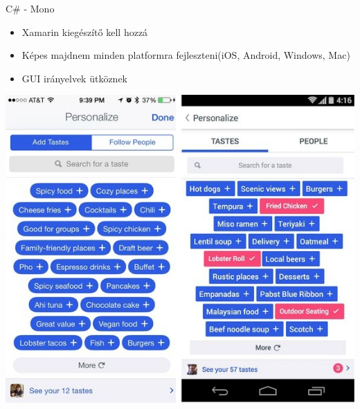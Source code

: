 \documentclass{beamer}
\begin{document}
\begin{frame}[fragile]{C\# - Mono}
	\begin{minipage}{0.49\textwidth}
		\begin{itemize}
			\item Xamarin kiegészítő kell hozzá
			\item Képes majdnem minden platformra fejleszteni(iOS, Android, Windows, Mac)
			\item GUI irányelvek ütköznek
		\end{itemize}
	\end{minipage}
	\begin{minipage}{.69\textheight}
		\centering
		\includegraphics[width=1\linewidth]{figures/iosvsandroid.jpg}
	\end{minipage}
\end{frame}
\end{document}
